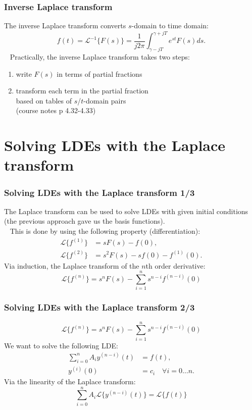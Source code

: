 \begin{frame}
\frametitle{Inverse Laplace transform}
The inverse Laplace transform converts $s$-domain to time domain:
\begin{equation*}
f(t) = \mathcal{L}^{-1}\{F(s)\} = \frac{1}{j2\pi}\int_{\gamma-jT}^{\gamma+jT} e^{st} F(s) ds.
\end{equation*}
\pause
\ \newline
Practically, the inverse Laplace transform takes two steps:
\begin{enumerate}
\item write $F(s)$ in terms of partial fractions
\item transform each term in the partial fraction \\ based on tables of $s$/$t$-domain pairs \\ (course notes p 4.32-4.33)
\end{enumerate}
\end{frame}

\section{Solving LDEs with the Laplace transform}

\begin{frame}
\frametitle{Solving LDEs with the Laplace transform 1/3}
The Laplace transform can be used to solve LDEs with given initial conditions 
(the previous approach gave us the basis functions). \\
\pause
\ \newline
This is done by using the following property (differentiation):
\begin{align*}
\mathcal{L}\{f^{(1)}\} &= s F(s) - f(0), \\
\mathcal{L}\{f^{(2)}\} &= s^2 F(s) -s f(0) - f^{(1)}(0).
\end{align*}
\pause
Via induction, the Laplace transform of the $n$th order derivative:
\begin{equation*}
\mathcal{L}\{f^{(n)}\} = s^n F(s) - \sum_{i=1}^n s^{n-i}f^{(n-i)}(0)
\end{equation*}
\end{frame}

\begin{frame}
\frametitle{Solving LDEs with the Laplace transform 2/3}
\begin{equation*}
\mathcal{L}\{f^{(n)}\} = s^n F(s) - \sum_{i=1}^n s^{n-i}f^{(n-i)}(0)
\end{equation*}
\pause
We want to solve the following LDE:
\begin{align*}
\sum_{i=0}^{n} A_i y^{(n-i)}(t) &= f(t), \\
y^{(i)}(0) &= c_i \quad \forall i=0\ldots n.
\end{align*}
\pause
Via the linearity of the Laplace transform:
\begin{equation*}
\sum_{i=0}^{n} A_i \mathcal{L}\{y^{(n-i)}(t)\} = \mathcal{L}\{f(t)\} 
\end{equation*}
\end{frame}

